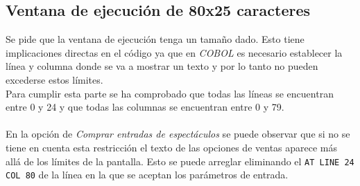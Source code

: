 \documentclass[10pt,a4paper]{article}
\begin{document}
\newpage
\subsection{Ventana de ejecución de 80x25 caracteres}

Se pide que la ventana de ejecución tenga un tamaño dado. Esto tiene implicaciones directas en el código ya que en \emph{COBOL} es necesario establecer la línea y columna donde se va a mostrar un texto y por lo tanto no pueden excederse estos límites.\\
Para cumplir esta parte se ha comprobado que todas las líneas se encuentran entre 0 y 24 y que todas las columnas se encuentran entre 0 y 79.\\
\\
En la opción de \emph{Comprar entradas de espectáculos} se puede observar que si no se tiene en cuenta esta restricción el texto de las opciones de ventas aparece más allá de los límites de la pantalla. Esto se puede arreglar eliminando el \texttt{AT LINE 24 COL 80} de la línea en la que se aceptan los parámetros de entrada.
\end{document}
